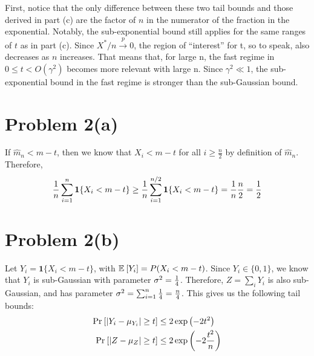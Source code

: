 \documentclass[11pt]{article}
\newcommand{\1}{\mathbb{I}} %
\begin{document}
First, notice that the only difference between these two tail bounds and those derived in part (c) are the factor of $n$ in the numerator of the fraction in the exponential. Notably, the sub-exponential bound still applies for the same ranges of $t$ as in part (c). Since $X^* / n \overset{p}{\to} 0$, the region of ``interest'' for t, so to speak, also decreases as $n$ increases. That means that, for large n, the fast regime in $0 \leq t < O(\gamma^2)$ becomes more relevant with large n. Since $\gamma^2 \ll 1$, the sub-exponential bound in the fast regime is stronger than the sub-Gaussian bound. 
 
 
 
 \clearpage 
 \section*{Problem 2(a)}


If $\hat{m}_n < m - t$, then we know that $X_{i} < m - t$ for all $i \geq \frac{n}{2}$ by definition of $\hat{m}_n$. Therefore, 
\begin{align}
	\frac{1}{n} \sum_{i=1}^n \mathbf{1} \{ X_{i} < m - t  \} \geq \frac{1}{n} \sum_{i=1}^{n/2}  \mathbf{1} \{ X_{i} < m - t  \}
	= \frac{1}{n} \frac{n}{2} = \frac{1}{2} 
\end{align}


\clearpage 
 \section*{Problem 2(b)}
 
 Let $Y_i = \mathbf{1}\{ X_i < m - t \}$, with $\mathbb{E}_{}\left[Y_i\right] = P(X_i < m - t)$. Since $Y_i \in \{0, 1\}$, we know that $Y_i$ is sub-Gaussian with parameter $\sigma^2 = \frac{1}{4}$. Therefore, $Z = \sum_i Y_i$ is also sub-Gaussian, and has parameter $\sigma^2 = \sum_{i=1}^{n} \frac{1}{4} = \frac{n}{4}$. This gives us the following tail bounds:
 \begin{align}
 	\text{Pr}_{}\left[ |Y_i - \mu_{Y_i}  | \geq t \right] &\leq 2\exp\left(   -2 t^2  \right) \\
 		\text{Pr}_{}\left[ | Z - \mu_{Z}  | \geq t \right] &\leq 2\exp\left(   -2 \frac{t^2}{n}  \right) 
 \end{align}
\end{document}
